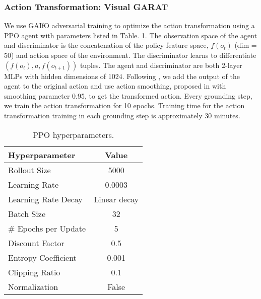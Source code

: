 \subsubsection{\textbf{Action Transformation: Visual GARAT}}
We use GAIfO adversarial training to optimize the action transformation using a PPO agent with parameters listed in Table. \ref{tab:ppo_hyperparameter}.  The observation space of the agent and discriminator is the concatenation of the policy feature space, $f(o_t)$ (dim = 50) and action space of the environment.  The discriminator learns to differentiate $(f(o_t),a,f(o_{t+1}))$ tuples.  The agent and discriminator are both 2-layer MLPs with hidden dimensions of 1024.  Following \citet{desai2020imitation}, we add the output of the agent to the original action and use action smoothing, proposed in \citet{hanna2017grounded} with smoothing parameter 0.95, to get the transformed action.  Every grounding step, we train the action transformation for 10 epochs. Training time for the action transformation training in each grounding step is approximately 30 minutes.

\begin{table}[ht]
    \caption{PPO hyperparameters.}
    \label{tab:ppo_hyperparameter}
    \centering
    \begin{tabular}{lc}
        \toprule
        Hyperparameter & Value \\
        \midrule
        Rollout Size & 5000 \\
        Learning Rate & 0.0003 \\
        Learning Rate Decay & Linear decay \\
        Batch Size & 32 \\
        \# Epochs per Update & 5 \\
        Discount Factor & 0.5 \\
        Entropy Coefficient & 0.001 \\
        Clipping Ratio & 0.1  \\
        Normalization & False  \\
        \bottomrule
    \end{tabular}
\end{table}

